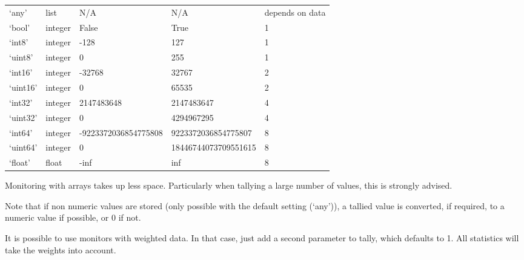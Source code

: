 \documentclass[letterpaper,10pt,english]{sphinxmanual}
\begin{document}
\begin{savenotes}\sphinxattablestart
\centering
\begin{tabulary}{\linewidth}[t]{|T|T|T|T|T|}
\hline
{}\relax &\relax &\relax &\relax &\relax \\
\hline
‘any’
&
list
&
N/A
&
N/A
&
depends on data
\\
\hline
‘bool’
&
integer
&
False
&
True
&
1
\\
\hline
‘int8’
&
integer
&
-128
&
127
&
1
\\
\hline
‘uint8’
&
integer
&
0
&
255
&
1
\\
\hline
‘int16’
&
integer
&
-32768
&
32767
&
2
\\
\hline
‘uint16’
&
integer
&
0
&
65535
&
2
\\
\hline
‘int32’
&
integer
&
2147483648
&
2147483647
&
4
\\
\hline
‘uint32’
&
integer
&
0
&
4294967295
&
4
\\
\hline
‘int64’
&
integer
&
-9223372036854775808
&
9223372036854775807
&
8
\\
\hline
‘uint64’
&
integer
&
0
&
18446744073709551615
&
8
\\
\hline
‘float’
&
float
&
-inf
&
inf
&
8
\\
\hline
\end{tabulary}
\par
\sphinxattableend\end{savenotes}

Monitoring with arrays takes up less space. Particularly when tallying a large
number of values, this is strongly advised.

Note that if non numeric values are stored (only possible with the default setting (‘any’)),
a tallied value is converted, if required, to a numeric value if possible, or 0 if not.

It is possible to use monitors with weighted data. In that case, just add a second parameter to tally, which defaults to 1.
All statistics will take the weights into account.
\end{document}
